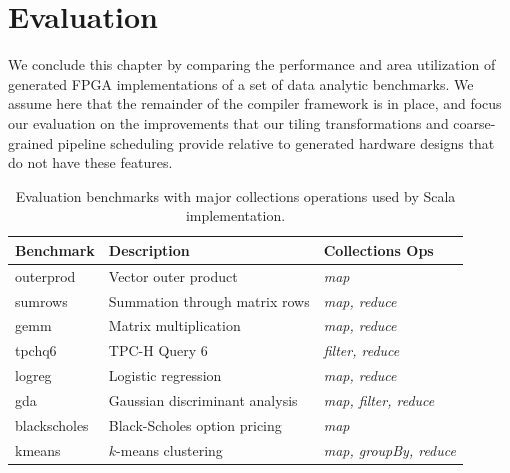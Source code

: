 \section{Evaluation}
\label{delite-evaluation}


We conclude this chapter by comparing the performance and
area utilization of generated FPGA implementations of a set of data analytic benchmarks.
We assume here that the remainder of the compiler framework is in place, and focus our evaluation on the improvements that our tiling transformations and
coarse-grained pipeline scheduling provide relative to
generated hardware designs that do not have these features.

\begin{table}
\centering\footnotesize
\hspace{-0.022\textwidth}\begin{tabular}{lll}
\toprule

{\bf Benchmark} & {\bf Description} & {\bf Collections Ops}\\ \midrule
outerprod & Vector outer product & \emph{map}\\ \midrule
sumrows & Summation through matrix rows & \emph{map, reduce}\\ \midrule
gemm & Matrix multiplication & \emph{map, reduce}\\ \midrule
tpchq6 & TPC-H Query 6 & \emph{filter, reduce}\\ \midrule
logreg & Logistic regression & \emph{map, reduce}\\ \midrule
gda & Gaussian discriminant analysis & \emph{map, filter, reduce}\\ \midrule
blackscholes & Black-Scholes option pricing & \emph{map}\\ \midrule
kmeans & $k$-means clustering & \emph{map, groupBy, reduce}\\ \bottomrule
\end{tabular}

\caption{Evaluation benchmarks with major collections operations used by
Scala implementation.}
\label{table:benchmarks}
\end{table}

